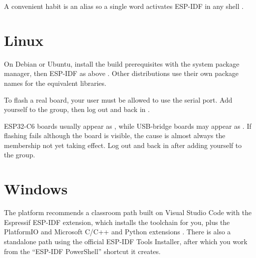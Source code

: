 A convenient habit is an alias so a single word activates ESP-IDF in any shell
\citep{prg32repo}.



\section{Linux}

On Debian or Ubuntu, install the build prerequisites with the system package
manager, then ESP-IDF as above \citep{prg32repo}. Other distributions use their own
package names for the equivalent libraries.



To flash a real board, your user must be allowed to use the serial port. Add
yourself to the  group, then log out and back in
\citep{prg32repo}.



\begin{prgaside}
ESP32\nobreakdash-C6 boards usually appear as , while USB-bridge boards may
appear as  \citep{prg32repo}. If flashing fails although the
board is visible, the cause is almost always the  membership not yet
taking effect. Log out and back in after adding yourself to the group.
\end{prgaside}

\section{Windows}

The platform recommends a classroom path built on Visual Studio Code with the
Espressif ESP-IDF extension, which installs the toolchain for you, plus the
PlatformIO and Microsoft C/C++ and Python extensions \citep{prg32repo}. There is
also a standalone path using the official ESP-IDF Tools Installer, after which you
work from the ``ESP-IDF PowerShell'' shortcut it creates.

